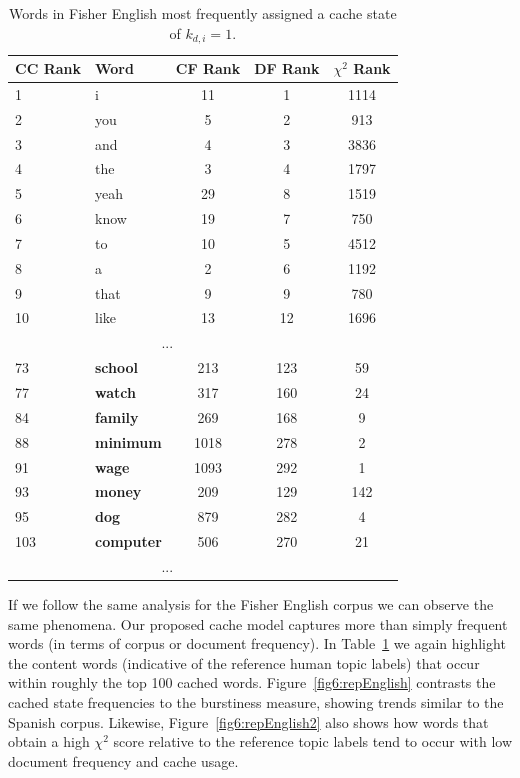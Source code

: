 \begin{table}
\begin{center}
\small
\begin{tabular}{l|lccc}
CC Rank & Word & CF Rank & DF Rank & $\chi^2$ Rank\\ \midrule
1 & i & 11 & 1 & 1114 \\
2 & you & 5 & 2 & 913 \\
3 & and & 4 & 3 & 3836 \\
4 & the & 3 & 4 & 1797 \\
5 & yeah & 29 & 8 & 1519 \\
6 & know & 19 & 7 & 750 \\
7 & to & 10 & 5 & 4512 \\
8 & a & 2 & 6 & 1192 \\
9 & that & 9 & 9 & 780 \\
10 & like & 13 & 12 & 1696 \\
\multicolumn{4}{c}{...} \\
73 & \textbf{school} & 213 & 123 & 59 \\
77 & \textbf{watch} & 317 & 160 & 24 \\
84 & \textbf{family} & 269 & 168 & 9 \\
88 & \textbf{minimum} & 1018 & 278 & 2 \\
91 & \textbf{wage} & 1093 & 292 & 1 \\
93 & \textbf{money} & 209 & 129 & 142 \\
95 & \textbf{dog} & 879 & 282 & 4 \\
103 & \textbf{computer} & 506 & 270 & 21 \\
\multicolumn{4}{c}{ ...} \\
\end{tabular}
\end{center}
\caption[Fisher English words most frequently generated from cache]{Words in Fisher English most frequently assigned a cache state of $k_{d,i}=1$. \label{fig6:fshWords}}
\end{table}


If we follow the same analysis for the Fisher English corpus we can observe the same phenomena.  Our proposed cache model captures more than simply frequent words (in terms of corpus or document frequency).  In Table~\ref{fig6:fshWords} we again highlight the content words (indicative of the reference human topic labels) that occur within roughly the top 100 cached words.   Figure~\ref{fig6:repEnglish} contrasts the cached state frequencies to the burstiness measure, showing trends similar to the Spanish corpus.  Likewise, Figure~\ref{fig6:repEnglish2} also shows how words that obtain a high $\chi^2$ score relative to the reference topic labels tend to occur with low document frequency and cache usage.  


